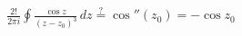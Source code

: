 \documentclass[preview]{standalone}
\begin{document}
\begin{align*}
\frac{2!}{2\pi i}\oint \frac{\cos z}{(z-z_0)^3}\,dz \stackrel{?}{=} \cos''(z_0) = -\cos z_0
\end{align*}
\end{document}
